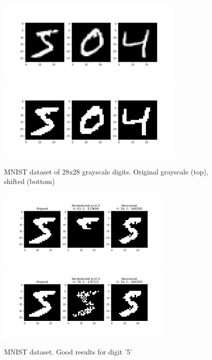 \documentclass[11pt]{article}
\begin{document}
	\begin{figure}
	\begin{center}
	\includegraphics[width=0.8\textwidth]{../img/digits.png}
	\includegraphics[width=0.8\textwidth]{../img/digits_shifted.png}
	\caption{MNIST dataset of 28x28 grayscale digits. Original grayscale (top), shifted (bottom)}
	\label{fig:digits}	
	\end{center}	
	\end{figure}

	\begin{figure}
	\begin{center}
	\includegraphics[width=0.75\textwidth]{"../img/digits_result_good_covered.png"}\\
	\includegraphics[width=0.75\textwidth]{"../img/digits_result_good_random.png"}
	\caption{MNIST dataset. Good results for digit '5'}
	\label{fig:digits_good}
	\end{center}
	\end{figure}
\end{document}
